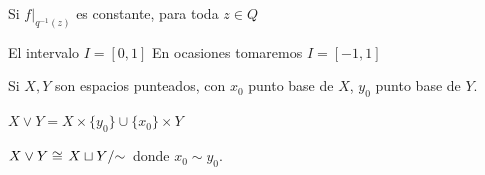 
\begin{tcolorbox}[colback=lime!15!white,colframe=green!55!black,title=\textbf{Ejemplo}]
    Si \(f|_{q^{-1}(z)}\) es constante, para toda \(z\in Q\)
\end{tcolorbox}


\begin{tcolorbox}
    El intervalo \(I=[0, 1]\)
    \tcblower
    En ocasiones tomaremos \(I=[-1, 1]\)
\end{tcolorbox}

\begin{tcolorbox}[colback=white!15!white,colframe=red!75!black,title=\textbf{Producto cuña, cuña de espacios}\index{producto cuña, cuña de espacios}]
    Si \(X, Y\) son espacios punteados, con \(x_0\) punto base de \(X\), \(y_0\) punto base de \(Y\).
    \begin{center}
        \(X\vee Y= X\times\{y_0\}\cup\{x_0\}\times Y\)
    \end{center}
\tcblower
    \begin{center}
        \(X\vee Y \cong \left.X\sqcup Y\middle/\sim\right.\) donde \(x_0 \sim y_0\).
    \end{center}
\end{tcolorbox}

